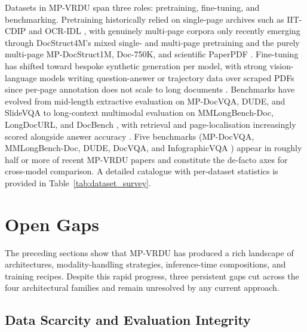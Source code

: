 \documentclass[11pt]{article}
\begin{document}
Datasets in MP-VRDU span three roles: pretraining, fine-tuning, and benchmarking. Pretraining historically relied on single-page archives such as IIT-CDIP \cite{lewis2006building} and OCR-IDL \cite{biten2022ocridl}, with genuinely multi-page corpora only recently emerging through DocStruct4M's mixed single- and multi-page pretraining \cite{hu2024mplugdocowl} and the purely multi-page MP-DocStruct1M, Doc-750K, and scientific PaperPDF \cite{hu2025mplugdocowl2,duan2025docopilot,xie2024wukong}. Fine-tuning has shifted toward bespoke synthetic generation per model, with strong vision-language models writing question-answer or trajectory data over scraped PDFs since per-page annotation does not scale to long documents \cite{tanaka2024instructdoc,jain2025simpledoc,xiong2026docr1,zhang2026docdancer}. Benchmarks have evolved from mid-length extractive evaluation on MP-DocVQA, DUDE, and SlideVQA \cite{tito2023hierarchical,vanlandeghem2023document,tanaka2023slidevqa} to long-context multimodal evaluation on MMLongBench-Doc, LongDocURL, and DocBench \cite{ma2024mmlongbenchdoc,deng2025longdocurl,zou2024docbench}, with retrieval and page-localisation increasingly scored alongside answer accuracy \cite{hui2024uda,xiong2026docr1,zhu2025doclens}. Five benchmarks (MP-DocVQA, MMLongBench-Doc, DUDE, DocVQA, and InfographicVQA \cite{mathew2022infographicvqa}) appear in roughly half or more of recent MP-VRDU papers and constitute the de-facto axes for cross-model comparison. A detailed catalogue with per-dataset statistics is provided in Table~\ref{tab:dataset_survey}.

\section{Open Gaps}
\label{sec:gaps}

The preceding sections show that MP-VRDU has produced a rich landscape of architectures, modality-handling strategies, inference-time compositions, and training recipes. Despite this rapid progress, three persistent gaps cut across the four architectural families and remain unresolved by any current approach.

\subsection{Data Scarcity and Evaluation Integrity}
\end{document}
